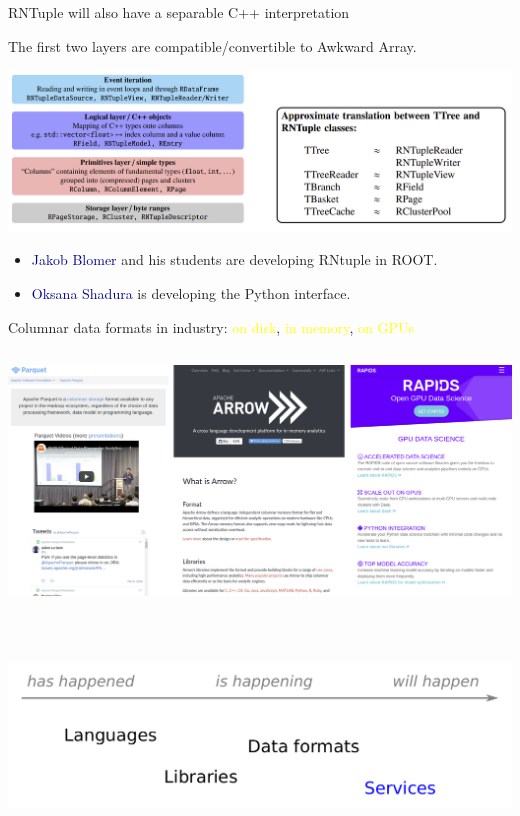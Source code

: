 \documentclass[aspectratio=169]{beamer}
\begin{document}
\begin{frame}{RNTuple will also have a separable C++ interpretation}
\large
\vspace{0.5 cm}

\begin{center}
The first two layers are compatible/convertible to Awkward Array.

\vspace{0.25 cm}
\includegraphics[width=\linewidth]{img/rntuple-layers.png}
\end{center}

\begin{itemize}
\item \textcolor{darkblue}{Jakob Blomer} and his students are developing RNtuple in ROOT.
\item \textcolor{darkblue}{Oksana Shadura} is developing the Python interface.
\end{itemize}
\end{frame}

\begin{frame}{Columnar data formats in industry: \textcolor{yellow}{on disk}, \textcolor{yellow}{in memory}, \textcolor{yellow}{on GPUs}}
\large
\vspace{0.35 cm}
\begin{columns}
\includegraphics[width=\linewidth]{img/three-columnar-websites.png}

\vspace{-1.8 cm}
\vspace{1.8 cm}
\end{columns}
\end{frame}

\begin{frame}{\mbox{ }}
\vspace{0.5 cm}

\begin{center}
\includegraphics[width=0.9\linewidth]{img/topics-4.pdf}
\end{center}
\end{frame}
\end{document}
